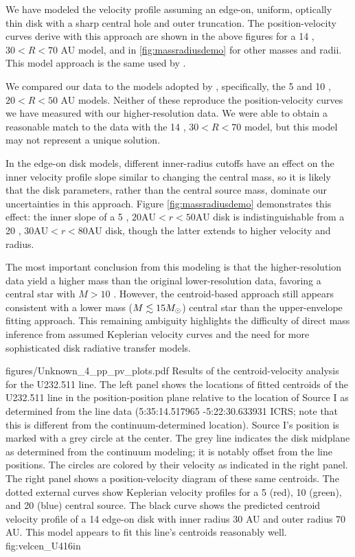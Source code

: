 \documentclass[twocolumn]{aastex61}
\begin{document}
We have modeled the velocity profile assuming an edge-on, uniform, optically
thin disk with a sharp central hole and outer truncation.  The
position-velocity curves derive with this approach are shown in the above
figures for a 14 \msun, $30 < R < 70$ AU model, and in \ref{fig:massradiusdemo}
for other masses and radii.  This model approach is the same used by
\citet{Plambeck2016a}.

We compared our data to the models adopted by \citet{Plambeck2016a},
specifically, the 5 and 10 \msun, $20 < R < 50$ AU models.  Neither of these
reproduce the position-velocity curves we have measured with our
higher-resolution data.  We were able to obtain a reasonable match
to the data with the 14 \msun, $30 < R < 70$ \msun model, but this model
may not represent a unique solution.


In the edge-on disk models, different inner-radius cutoffs have an effect on
the inner velocity profile slope similar to changing the central mass, so it is
likely that the disk parameters, rather than the central source mass, dominate
our uncertainties in this approach.  
Figure \ref{fig:massradiusdemo} demonstrates this effect: the inner slope of
a 5 \msun, $20 \mathrm{AU} < r < 50 \mathrm{AU}$ disk is indistinguishable
from a 20 \msun , $30 \mathrm{AU} < r < 80 \mathrm{AU}$ disk, though the latter
extends to higher velocity and radius.

The most important conclusion from this modeling is that the higher-resolution
data yield a higher mass than the original lower-resolution data, favoring
a central star with $M>10$ \msun.  However, the centroid-based approach
still appears consistent with a lower mass ($M\lesssim15M_{\odot}$) central star
than the \citet{Seifried2016a} upper-envelope fitting approach.  This remaining
ambiguity highlights the difficulty of direct mass inference from assumed
Keplerian velocity curves and the need for more sophisticated disk radiative
transfer models.

\Figure
{figures/Unknown_4_pp_pv_plots.pdf}
{Results of the centroid-velocity analysis for the U232.511 line.
The left panel shows the locations of fitted centroids of the U232.511 line in
the position-position plane relative to the location of Source I as determined
from the line data (5:35:14.517965 -5:22:30.633931 ICRS; note that this is
different from the continuum-determined location).  Source I's position is
marked with a grey circle at the center.  The grey line indicates the disk
midplane as determined from the continuum modeling; it is notably offset from
the line positions.  The circles are colored by their velocity as indicated in
the right panel.  The right panel shows a position-velocity diagram of these
same centroids.  The dotted external curves show Keplerian velocity profiles
for a 5 (red), 10 (green), and 20 (blue) \msun central source.  The black
curve shows the predicted centroid velocity profile of a 14 \msun  edge-on disk
with inner radius 30 AU and outer radius 70 AU.
This model appears to fit this line's centroids reasonably well.
}
{fig:velcen_U4}{1}{6in}
\end{document}
